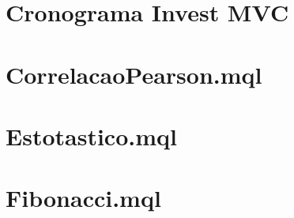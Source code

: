 \begin{apendicesenv}

\partapendices

\chapter{}


\chapter{}


\chapter{}


\chapter{}


\chapter{}


\chapter{}


\chapter{Cronograma Invest MVC}
\chapter{CorrelacaoPearson.mql}


\chapter{Estotastico.mql}


\chapter{Fibonacci.mql}



\end{apendicesenv}
